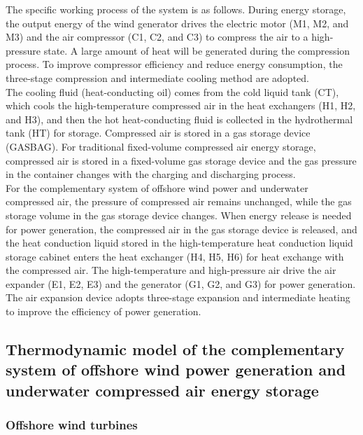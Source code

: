 \documentclass[journal,onecolumn]{IEEEtran}
\begin{document}
The specific working process of the system is as follows. During energy storage, the output energy of the wind generator drives the electric motor (M1, M2, and M3) and the air compressor (C1, C2, and C3) to compress the air to a high-pressure state. A large amount of heat will be generated during the compression process. To improve compressor efficiency and reduce energy consumption, the three-stage compression and intermediate cooling method are adopted.\\

The cooling fluid (heat-conducting oil) comes from the cold liquid tank (CT), which cools the high-temperature compressed air in the heat exchangers (H1, H2, and H3), and then the hot heat-conducting fluid is collected in the hydrothermal tank (HT) for storage. Compressed air is stored in a gas storage device (GASBAG). For traditional fixed-volume compressed air energy storage, compressed air is stored in a fixed-volume gas storage device and the gas pressure in the container changes with the charging and discharging process. \\

For the complementary system of offshore wind power and underwater compressed air, the pressure of compressed air remains unchanged, while the gas storage volume in the gas storage device changes. When energy release is needed for power generation, the compressed air in the gas storage device is released, and the heat conduction liquid stored in the high-temperature heat conduction liquid storage cabinet enters the heat exchanger (H4, H5, H6) for heat exchange with the compressed air. The high-temperature and high-pressure air drive the air expander (E1, E2, E3) and the generator (G1, G2, and G3) for power generation. The air expansion device adopts three-stage expansion and intermediate heating to improve the efficiency of power generation.





\subsection{Thermodynamic model of the complementary system of offshore wind power generation and underwater compressed air energy storage}
\subsubsection{Offshore wind turbines}\ \\
\end{document}
